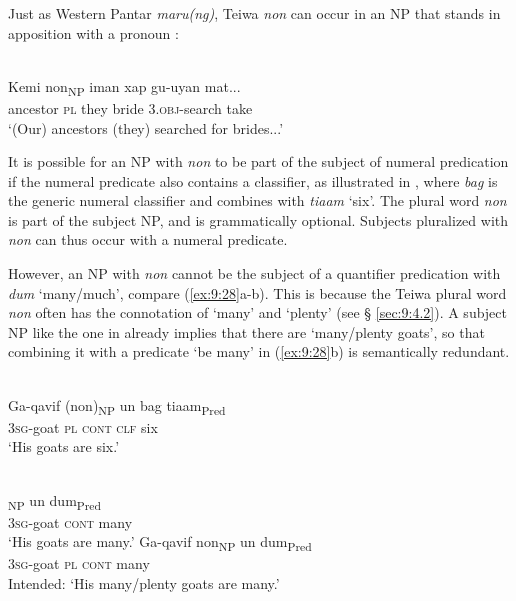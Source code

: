 Just as Western Pantar \textit{maru(ng)}, Teiwa \textit{non} can occur in an NP that stands in apposition with a pronoun :


\ea%
\label{ex:9:26}
 \\
\gll {\ob}Kemi  {non}{\cb}\textsubscript{\upshape NP} iman xap gu-uyan mat... \\
  ancestor \textsc{pl} they bride  3.\textsc{obj-}search take  \\
\glt `(Our) ancestors (they) searched for brides...'
\z






It is possible for an NP with \textit{non} to be part of the subject of numeral predication if the numeral predicate also contains a classifier, as illustrated in , where \textit{bag} is the generic numeral classifier \citep{Klamer2014history} and combines with \textit{tiaam} `six'. The plural word \textit{non} is part of the subject NP, and is grammatically optional. Subjects pluralized with \textit{non} can thus occur with a numeral predicate.

However, an NP with \textit{non} cannot be the subject of a quantifier predication with \textit{dum} `many/much', compare (\ref{ex:9:28}a-b). This is because the Teiwa plural word \textit{non} often has the connotation of `many' and `plenty' (see {\S} \ref{sec:9:4.2}). A subject NP like the one in  already implies that there are `many/plenty goats', so that combining it with a predicate `be many' in (\ref{ex:9:28}b) is semantically redundant.


\ea%
\label{ex:9:27}
 \\
\gll {\ob}Ga-qavif (non){\cb}\textsubscript{\upshape NP} {\ob}{un} bag {tiaam}{\cb}\textsubscript{\upshape Pred} \\
    \textsc{3sg}-goat \textsc{pl} \textsc{cont} \textsc{clf} six \\
\glt `His goats are six.'
\z







\ea%
\label{ex:9:28}
 \\
\ea
{}\textsubscript{\upshape NP} {\ob}un dum{\cb}\textsubscript{\upshape Pred}  \\
 \textsc{3sg}-goat \textsc{cont} many   \\
\glt `His goats are many.'
\ex
\gll *{\ob}Ga-qavif non{\cb}\textsubscript{\upshape NP} {\ob}un dum{\cb}\textsubscript{\upshape Pred}  \\
    \textsc{3sg}-goat \textsc{pl} \textsc{cont} many\\
\glt Intended: `His many/plenty goats are many.'
\z
\z






